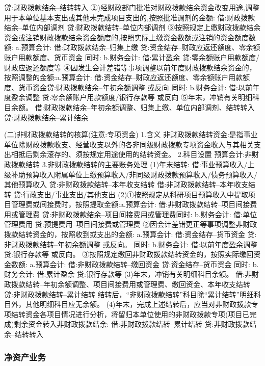 \documentclass[UTF8,12pt]{ctexart}
\numberwithin{equation}{section} %
\numberwithin{figure}{section}
\numberwithin{table}{section}
\begin{document}
	贷:财政拨款结余--结转转入
	②)经财政部门批准对财政拨款结余资金改变用途,调整用于本单位基本支出或其他未完成项目支出的,按照批准调剂的金额:
	借:财政拨款结余--单位内部调剂
	贷:财政拨款结转--单位内部调剂
	③按照规定上缴财政拨款结余资金或注销财政拨款结余资金额度的,按照实际上缴资金数额或注销的资金额度数额:
	a.预算会计:
	借:财政拨款结余--归集上缴
	贷:资金结存--财政应返还额度、零余额账户用款额度、货币资金
	同时:
	b.财务会计:
	借:累计盈余
	贷:零余额账户用款额度/财政应返还额度等
	④因发生会计差错等事项调整以前年度财政拨款结余资金的，按照调整的金额:a.预算会计:
	借:资金结存--财政应返还额度、零余额账户用款额度、货币资金贷:财政拨款结余--年初余额调整
	或反向
	同时:
	b.财务会计:
	借:以前年度盈余调整
	贷:零余额账户用款额度/银行存款等
	或反向
	⑤年末，冲销有关明细科目余额。
	借:财政拨款结余--年初余额调整、归集上缴、单位内部调剂、结转转入贷:财政拨款结余--累计结余
	
	(二)非财政拨款结转的核算(注意:专项资金)
	1.含义
	非财政拨款结转资金:是指事业单位除财政拨款收支、经营收支以外的各非同级财政拨款专项资金收入与其相关支出相抵后剩余滚存的、须按规定用途使用的结转资金。
	2.科目设置
	预算会计:非财政拨款结转
	3.非财政拨款结转的主要账务处理
	(1)年末结转:
	借:事业预算收入/上级补助预算收入附属单位上缴预算收入/非同级财政拨款预算收入/债务预算收入/其他预算收入
	贷:非财政拨款结转--本年收支结转
	借:非财政拨款结转--本年收支结转
	贷:行政支出/事业支出/其他支出
	(2)①按照规定从科研项目预算收入中提取项目管理费或间接费时，按照提取金额:a.预算会计:
	借:非财政拨款结转--项目间接费用或管理费
	贷:非财政拨款结余--项目间接费用或管理费同时:
	b.财务会计:
	借:单位管理费用
	贷:预提费用--项目间接费或管理费
	②因会计差错更正等事项调整非财政拨款结转资金的，按照收到或支出的金额:
	a.预算会计:
	借:资金结存--货币资金
	贷:非财政拨款结转--年初余额调整
	或反向。
	同时:
	b.财务会计:
	借:以前年度盈余调整
	贷:银行存款等
	或反向。
	③按照规定缴回非财政拨款结转资金的，按照实际缴回资金数额:
	a.预算会计:
	借:非财政拨款结转--缴回资金
	贷:资金结存--货币资金
	同时:
	b.财务会计:
	借:累计盈余
	贷:银行存款等
	(3)年末，冲销有关明细科目余额。
	借:非财政拨款结转--年初余额调整、项目间接费用或管理费、缴回资金、本年收支结转
	贷:非财政拨款结转--累计结转
	结转后，“非财政拨款结转”科目除“累计结转”明细科目外，其他明细科目应无余额。
	(4)年末，完成上述结转后，应当对非财政拨款专项结转资金各项目情况进行分析，将留归本单位使用的非财政拨款专项(项目已完成)剩余资金转入非财政拨款结余:
	借:非财政拨款结转--累计结转
	贷:非财政拨款结余--结转转入
	
	
	\subsubsection{净资产业务}
\end{document}
